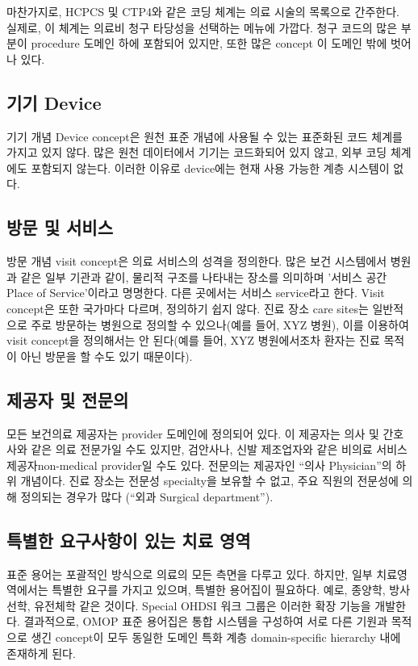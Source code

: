 \documentclass[10.5pt]{book}
\theoremstyle{definition}
\theoremstyle{definition}
\theoremstyle{definition}
\theoremstyle{remark}
\begin{document}
마찬가지로, HCPCS 및 CTP4와 같은 코딩 체계는 의료 시술의 목록으로
간주한다. 실제로, 이 체계는 의료비 청구 타당성을 선택하는 메뉴에 가깝다.
청구 코드의 많은 부분이 procedure 도메인 하에 포함되어 있지만, 또한 많은
concept 이 도메인 밖에 벗어나 있다.

\subsection{기기 Device}\label{-device}

기기 개념 Device concept은 원천 표준 개념에 사용될 수 있는 표준화된 코드
체계를 가지고 있지 않다. 많은 원천 데이터에서 기기는 코드화되어 있지
않고, 외부 코딩 체계에도 포함되지 않는다. 이러한 이유로 device에는 현재
사용 가능한 계층 시스템이 없다.

\subsection{방문 및 서비스}\label{--}

방문 개념 visit concept은 의료 서비스의 성격을 정의한다. 많은 보건
시스템에서 병원과 같은 일부 기관과 같이, 물리적 구조를 나타내는 장소를
의미하며 '서비스 공간 Place of Service'이라고 명명한다. 다른 곳에서는
서비스 service라고 한다. Visit concept은 또한 국가마다 다르며, 정의하기
쉽지 않다. 진료 장소 care sites는 일반적으로 주로 방문하는 병원으로
정의할 수 있으나(예를 들어, XYZ 병원), 이를 이용하여 visit concept을
정의해서는 안 된다(예를 들어, XYZ 병원에서조차 환자는 진료 목적이 아닌
방문을 할 수도 있기 때문이다).

\subsection{제공자 및 전문의}\label{--}

모든 보건의료 제공자는 provider 도메인에 정의되어 있다. 이 제공자는 의사
및 간호사와 같은 의료 전문가일 수도 있지만, 검안사나, 신발 제조업자와
같은 비의료 서비스 제공자non-medical provider일 수도 있다. 전문의는
제공자인 ``의사 Physician''의 하위 개념이다. 진료 장소는 전문성
specialty을 보유할 수 없고, 주요 직원의 전문성에 의해 정의되는 경우가
많다 (``외과 Surgical department'').

\subsection{특별한 요구사항이 있는 치료 영역}\label{----}

표준 용어는 포괄적인 방식으로 의료의 모든 측면을 다루고 있다. 하지만,
일부 치료영역에서는 특별한 요구를 가지고 있으며, 특별한 용어집이
필요하다. 예로, 종양학, 방사선학, 유전체학 같은 것이다. Special OHDSI
워크 그룹은 이러한 확장 기능을 개발한다. 결과적으로, OMOP 표준 용어집은
통합 시스템을 구성하여 서로 다른 기원과 목적으로 생긴 concept이 모두
동일한 도메인 특화 계층 domain-specific hierarchy 내에 존재하게 된다.
\end{document}
